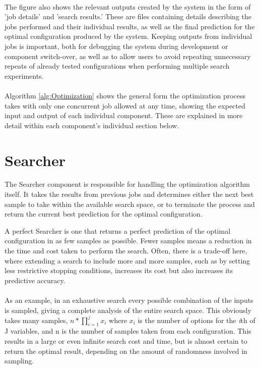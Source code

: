\documentclass{report}
\begin{document}
\paragraph{}
The figure also shows the relevant outputs created by the system in the form of 'job details' and 'search results.' These are files containing details describing the jobs performed and their individual results, as well as the final prediction for the optimal configuration produced by the system. Keeping outputs from individual jobs is important, both for debugging the system during development or component switch-over, as well as to allow users to avoid repeating unnecessary repeats of already tested configurations when performing multiple search experiments.
\paragraph{}
Algorithm \ref{alg:Optimization} shows the general form the optimization process takes with only one concurrent job allowed at any time, showing the expected input and output of each individual component. These are explained in more detail within each component's individual section below.

\section{Searcher}
The Searcher component is responsible for handling the optimization algorithm itself. It takes the results from previous jobs and determines either the next best sample to take within the available search space, or to terminate the process and return the current best prediction for the optimal configuration. 

A perfect Searcher is one that returns a perfect prediction of the optimal configuration in as few samples as possible. Fewer samples means a reduction in the time and cost taken to perform the search. Often, there is a trade-off here, where extending a search to include more and more samples, such as by setting less restrictive stopping conditions, increases its cost but also increases its predictive accuracy.

\paragraph{}
As an example, in an exhaustive search every possible combination of the inputs is sampled, giving a complete analysis of the entire search space. This obviously takes many samples, $n * \prod_{i=1}^{j} x_{i}$ where $x_{i}$ is the number of options for the \textit{i}th of J variables, and n is the number of samples taken from each configuration. This results in a large or even infinite search cost and time, but is almost certain to return the optimal result, depending on the amount of randomness involved in sampling.
\end{document}
